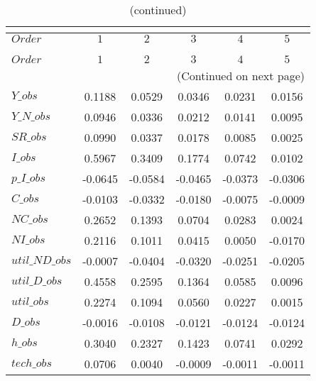  
\begin{center}
\begin{longtable}{lccccc} 
\caption{COEFFICIENTS OF AUTOCORRELATION}\\
 \label{Table:th_autocorr_matrix}\\
\toprule 
$Order          $	 & 	 $          1$	 & 	 $          2$	 & 	 $          3$	 & 	 $          4$	 & 	 $          5$\\
\midrule \endfirsthead 
\caption{(continued)}\\
 \toprule \\ 
$Order          $	 & 	 $          1$	 & 	 $          2$	 & 	 $          3$	 & 	 $          4$	 & 	 $          5$\\
\midrule \endhead 
\midrule \multicolumn{6}{r}{(Continued on next page)} \\ \bottomrule \endfoot 
\bottomrule \endlastfoot 
$Y\_obs         $	 & 	     0.1188	 & 	     0.0529	 & 	     0.0346	 & 	     0.0231	 & 	     0.0156 \\ 
$Y\_N\_obs      $	 & 	     0.0946	 & 	     0.0336	 & 	     0.0212	 & 	     0.0141	 & 	     0.0095 \\ 
$SR\_obs        $	 & 	     0.0990	 & 	     0.0337	 & 	     0.0178	 & 	     0.0085	 & 	     0.0025 \\ 
$I\_obs         $	 & 	     0.5967	 & 	     0.3409	 & 	     0.1774	 & 	     0.0742	 & 	     0.0102 \\ 
$p\_I\_obs      $	 & 	    -0.0645	 & 	    -0.0584	 & 	    -0.0465	 & 	    -0.0373	 & 	    -0.0306 \\ 
$C\_obs         $	 & 	    -0.0103	 & 	    -0.0332	 & 	    -0.0180	 & 	    -0.0075	 & 	    -0.0009 \\ 
$NC\_obs        $	 & 	     0.2652	 & 	     0.1393	 & 	     0.0704	 & 	     0.0283	 & 	     0.0024 \\ 
$NI\_obs        $	 & 	     0.2116	 & 	     0.1011	 & 	     0.0415	 & 	     0.0050	 & 	    -0.0170 \\ 
$util\_ND\_obs  $	 & 	    -0.0007	 & 	    -0.0404	 & 	    -0.0320	 & 	    -0.0251	 & 	    -0.0205 \\ 
$util\_D\_obs   $	 & 	     0.4558	 & 	     0.2595	 & 	     0.1364	 & 	     0.0585	 & 	     0.0096 \\ 
$util\_obs      $	 & 	     0.2274	 & 	     0.1094	 & 	     0.0560	 & 	     0.0227	 & 	     0.0015 \\ 
$D\_obs         $	 & 	    -0.0016	 & 	    -0.0108	 & 	    -0.0121	 & 	    -0.0124	 & 	    -0.0124 \\ 
$h\_obs         $	 & 	     0.3040	 & 	     0.2327	 & 	     0.1423	 & 	     0.0741	 & 	     0.0292 \\ 
$tech\_obs      $	 & 	     0.0706	 & 	     0.0040	 & 	    -0.0009	 & 	    -0.0011	 & 	    -0.0011 \\ 
\end{longtable}
 \end{center}

